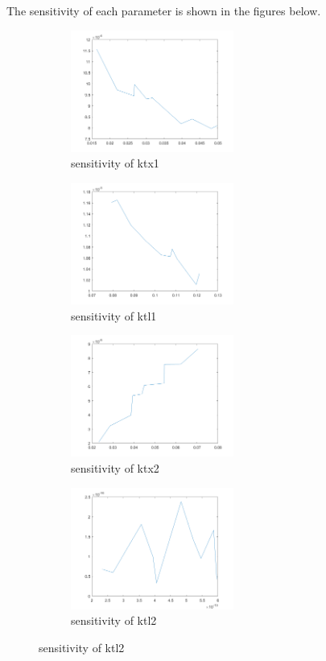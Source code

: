 The sensitivity of each parameter is shown in the figures below.
\begin{figure}[H]
	\centering
	\begin{subfigure}{0.5\textwidth}
		\includegraphics[height=4cm]{tx1.png}
		\caption{sensitivity of ktx1}
	\end{subfigure}%
	\begin{subfigure}{0.5\textwidth}
		\includegraphics[height=4cm]{tl1.png}
		\caption{sensitivity of ktl1}
	\end{subfigure}
	\begin{subfigure}{0.5\textwidth}
		\includegraphics[height=4cm]{tx2.png}
		\caption{sensitivity of ktx2}
	\end{subfigure}%
	\begin{subfigure}{0.5\textwidth}
		\includegraphics[height=4cm]{tl2.png}
		\caption{sensitivity of ktl2}
	\end{subfigure}

\end{figure}
